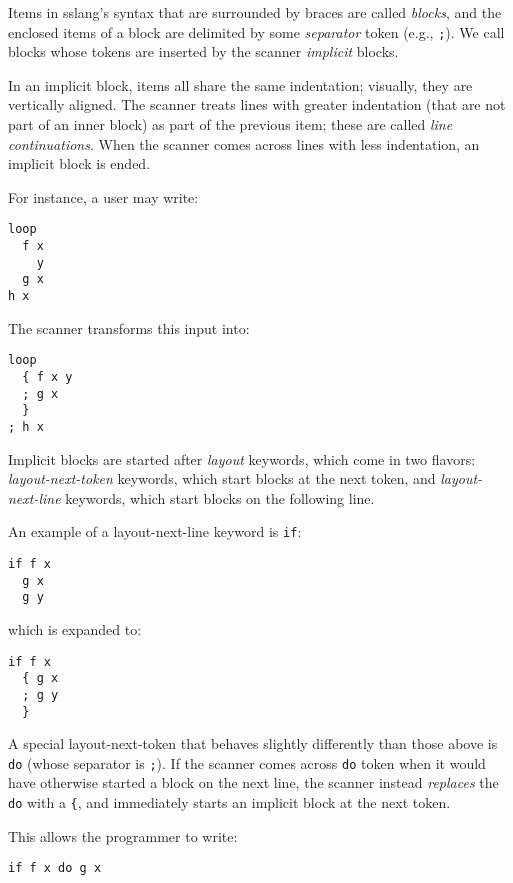\documentclass{article}
\begin{document}
Items in sslang's syntax that are surrounded by braces are called \emph{blocks}, and the enclosed items of a block are delimited by some \emph{separator} token (e.g., \texttt{;}). We call blocks whose tokens are inserted by the scanner \emph{implicit} blocks.

In an implicit block, items all share the same indentation; visually, they are vertically aligned. The scanner treats lines with greater indentation (that are not part of an inner block) as part of the previous item; these are called \emph{line continuations}. When the scanner comes across lines with less indentation, an implicit block is ended.

For instance, a user may write:

\begin{lstlisting}
loop
  f x
    y
  g x
h x
\end{lstlisting}

The scanner transforms this input into:

\begin{lstlisting}
loop
  { f x y
  ; g x
  }
; h x
\end{lstlisting}

Implicit blocks are started after \emph{layout} keywords, which come in two flavors: \emph{layout-next-token} keywords, which start blocks at the next token, and \emph{layout-next-line} keywords, which start blocks on the following line.

An example of a layout-next-line keyword is \texttt{if}:

\begin{lstlisting}
if f x
  g x
  g y
\end{lstlisting}

which is expanded to:

\begin{lstlisting}
if f x
  { g x
  ; g y
  }
\end{lstlisting}

A special layout-next-token that behaves slightly differently than those above is \texttt{do} (whose separator is \texttt{;}). If the scanner comes across \texttt{do} token when it would have otherwise started a block on the next line, the scanner instead \emph{replaces} the \texttt{do} with a \texttt{\{}, and immediately starts an implicit block at the next token.

This allows the programmer to write:

\begin{lstlisting}
if f x do g x
\end{lstlisting}
\end{document}
